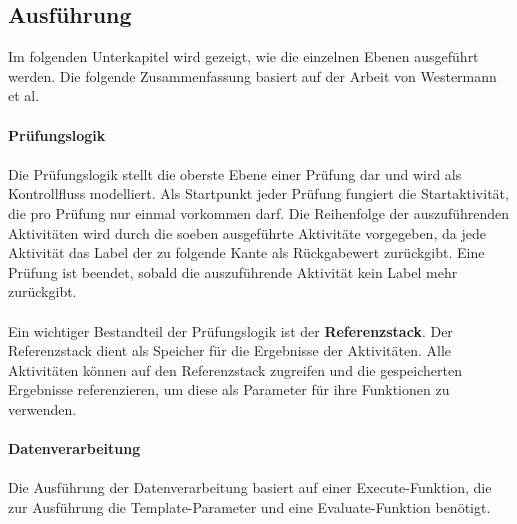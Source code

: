     \subsection{Ausführung}
    Im folgenden Unterkapitel wird gezeigt, wie die einzelnen Ebenen ausgeführt werden.
    Die folgende Zusammenfassung basiert auf der Arbeit von Westermann et al.\\
    \\
    \textbf{Prüfungslogik}\\
    \\
    Die Prüfungslogik stellt die oberste Ebene einer Prüfung dar und wird als Kontrollfluss modelliert.
    Als Startpunkt jeder Prüfung fungiert die Startaktivität, die pro Prüfung nur einmal vorkommen darf.
    Die Reihenfolge der auszuführenden Aktivitäten wird durch die soeben ausgeführte Aktivitäte vorgegeben, da jede Aktivität das Label der zu folgende Kante als Rückgabewert zurückgibt.
    Eine Prüfung ist beendet, sobald die auszuführende Aktivität kein Label mehr zurückgibt.\\
    \\
    Ein wichtiger Bestandteil der Prüfungslogik ist der \textbf{Referenzstack}. Der Referenzstack dient als Speicher für die Ergebnisse der Aktivitäten.
    Alle Aktivitäten können auf den Referenzstack zugreifen und die gespeicherten Ergebnisse referenzieren, um diese als Parameter für ihre Funktionen zu verwenden.\\
    \\
    \textbf{Datenverarbeitung}\\
    \\
    Die Ausführung der Datenverarbeitung basiert auf einer Execute-Funktion, die zur Ausführung die Template-Parameter und eine Evaluate-Funktion benötigt.
